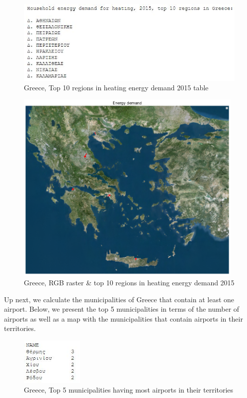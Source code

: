 \begin{figure}[h]
    \centering
    \includegraphics[width=12cm]{figures/q3_2_top_heating_table.JPG}
    \caption{Greece, Top 10 regions in heating energy demand 2015 table}
    \label{fig:Greece, Top 10 regions in heating energy demand 2015 table}
\end{figure}
\FloatBarrier %

\begin{figure}[h]
    \centering
    \includegraphics[width=11cm]{figures/q3_2_top_heating_map.png}
    \caption{Greece, RGB raster & top 10 regions in heating energy demand 2015}
    \label{fig:Greece, RGB raster & top 10 regions in heating energy demand 2015}
\end{figure}
\FloatBarrier %

Up next, we calculate the municipalities of Greece that contain at least one airport. Below, we present the top 5 municipalities in terms of the number of airports as well as a map with the municipalities that contain airports in their territories.

\begin{figure}[h]
    \centering
    \includegraphics[width=3cm]{figures/q3_2_most_airports_table.JPG}
    \caption{Greece, Top 5 municipalities having most airports in their territories}
    \label{fig:Greece, Top 5 municipalities having most airports in their territories}
\end{figure}
\FloatBarrier %

